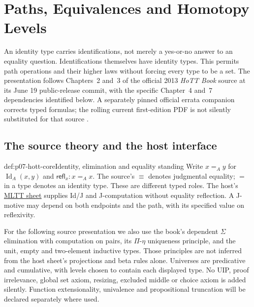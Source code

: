\chapter{Paths, Equivalences and Homotopy Levels}
\label{sec:p07-hott-paths-and-equivalences}

An identity type carries identifications, not merely a yes-or-no answer to
an equality question. Identifications themselves have identity types.
This permits path operations and their higher laws without forcing every
type to be a set. The presentation follows Chapters~2 and~3 of the official
2013 \emph{HoTT Book} source at its June 19 public-release commit, with the
specific Chapter~4 and~7 dependencies identified below. A separately pinned
official errata companion corrects typed formulas; the rolling current
first-edition PDF is not silently substituted for that source
\parencite[ch.~2--3]{HoTT2013PublicReleaseFoundations}.

\section{The source theory and the host interface}
\label{sec:p07-hott-theory}

\begin{hbconvention}{def:p07-hott-core}{Identity, elimination and equality standing}
Write $x=_Ay$ for $\operatorname{Id}_A(x,y)$ and
$\mathsf{refl}_x:x=_Ax$. The source's $\equiv$ denotes judgmental equality;
$=$ in a type denotes an identity type. These are different typed roles.
The host's \hyperref[sheet:mltt-intensional]{MLTT sheet} supplies Id/J and
J-computation without equality reflection. A J-motive may depend on both
endpoints and the path, with its specified value on reflexivity.

For the following source presentation we also use the book's dependent
$\Sigma$ elimination with computation on pairs, its $\Pi$-\(\eta\)
uniqueness principle, and the unit, empty and two-element inductive types.
Those principles are not inferred from the host sheet's projections and
beta rules alone. Universes are predicative and cumulative, with levels
chosen to contain each displayed type. No UIP, proof irrelevance, global
set axiom, resizing, excluded middle or choice axiom is added silently.
Function extensionality, univalence and propositional truncation will be
declared separately where used.
\end{hbconvention}

